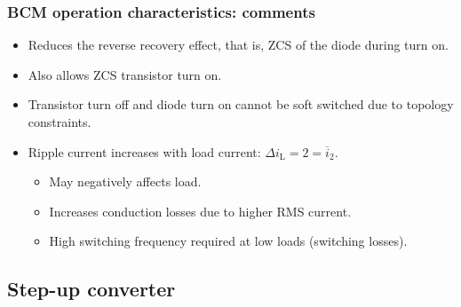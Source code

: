 \begin{frame}
    \frametitle{BCM operation characteristics: comments}
   \begin{itemize}
        \item<1-> Reduces the reverse recovery effect, that is, ZCS of the diode during turn on.
        \item<2-> Also allows ZCS transistor turn on.  
   \end{itemize}
   \vspace{1em}
    \begin{itemize}
          \item<3-> Transistor turn off and diode turn on cannot be soft switched due to topology constraints.
          \item<4-> Ripple current increases with load current: $ \Delta i_\mathrm{L} = 2=\overline{i}_2$.
          \begin{itemize}
            \item May negatively affects load.
            \item Increases conduction losses due to higher RMS current.
            \item High switching frequency required at low loads (switching losses).
          \end{itemize}
    \end{itemize}
\end{frame}

\subsection{Step-up converter}



